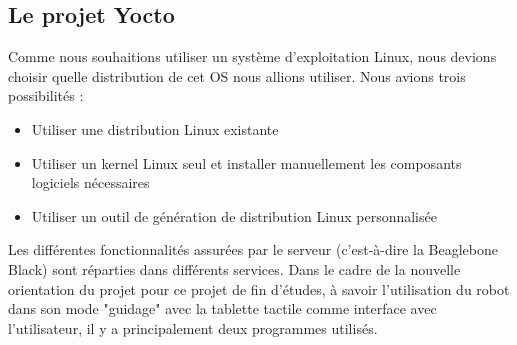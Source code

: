 \documentclass{report}
\begin{document}
    \subsection{Le projet Yocto}
    {Comme nous souhaitions utiliser un système d'exploitation Linux, nous devions
    choisir quelle distribution de cet OS nous allions utiliser. Nous avions trois
    possibilités :}
    \begin{itemize}
      \item Utiliser une distribution Linux existante
      \item Utiliser un kernel Linux seul et installer manuellement les composants logiciels nécessaires
      \item Utiliser un outil de génération de distribution Linux personnalisée
    \end{itemize}





    {Les différentes fonctionnalités assurées par le serveur (c'est-à-dire la
    Beaglebone Black) sont réparties dans différents services. Dans le cadre de la
    nouvelle orientation du projet pour ce projet de fin d'études, à savoir l'utilisation
    du robot dans son mode "guidage" avec la tablette tactile comme interface avec
    l'utilisateur, il y a principalement deux programmes utilisés.}
\end{document}
